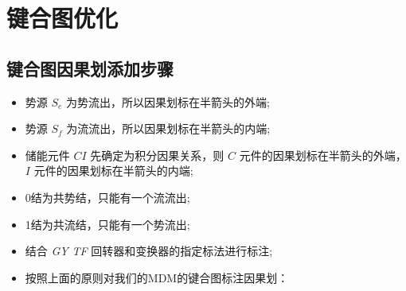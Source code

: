 \clearpage
\section{键合图优化}

\subsection{键合图因果划添加步骤}

\begin{itemize}
	\item 势源 $S_e$ 为势流出，所以因果划标在半箭头的外端;
	\item 势源 $S_f$ 为流流出，所以因果划标在半箭头的内端;
	\item 储能元件 $C I$ 先确定为积分因果关系，则 $C$ 元件的因果划标在半箭头的外端， $I$ 元件的因果划标在半箭头的内端;
	\item 0结为共势结，只能有一个流流出;
	\item 1结为共流结，只能有一个势流出;
	\item 结合 \textit{GY} \textit{TF} 回转器和变换器的指定标法进行标注;
	\item 按照上面的原则对我们的MDM的键合图标注因果划：
\end{itemize}